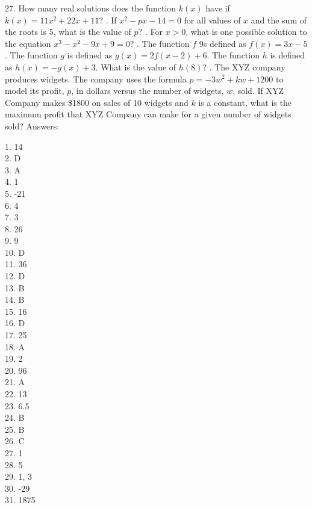 \documentclass[../satmath.tex]{subfiles}
\begin{document}
27. How many real solutions does the function $k(x)$ have if $k(x)=11x^2+22x+11$?
. If $x^2-px-14=0$ for all values of $x$ and the sum of the roots is 5, what is the value of $p$?
. For $x>0$, what is one possible solution to the equation $x^3-x^2-9x+9=0$?
. The function $f$ 9s defined as $f(x)=3x-5$. The function $g$ is defined as $g(x)=2f(x-2)+6$. The function $h$ is defined as $h(x)=-g(x)+3$. What is the value of $h(8)$?
. The XYZ company produces widgets. The company uses the formula $p=-3w^2+kw+1200$ to model its profit, $p$, in dollars versus the number of widgets, $w$, sold. 
If XYZ Company makes \$1800 on sales of 10 widgets and $k$ is a constant, what is the maximum profit that XYZ Company can make for a given number of widgets sold?
\medbreak 
Answers: 

1. 14\\
2. D\\
3. A\\
4. 1\\
5. -21\\
6. 4\\
7. 3\\
8. 26\\
9. 9\\
10. D\\
11. 36\\
12. D\\
13. B\\
14. B\\
15. 16\\
16. D\\
17. 25\\
18. A\\
19. 2\\
20. 96\\
21. A\\
22. 13\\
23. 6.5\\
24. B\\
25. B\\
26. C\\
27. 1\\
28. 5\\
29. 1, 3\\
30. -29\\
31. 1875
\end{document}
